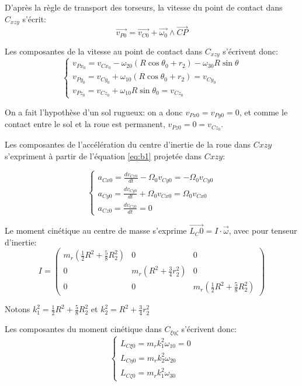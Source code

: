 D'après la règle de transport des torseurs, la vitesse du point de contact dans $C_{xzy}$ s'écrit:
\begin{equation}
    \vec{v_{P0}}=\vec{v_{C0}}+\vec{\omega_0} \wedge \vec{CP}
  \label{eq:b3}
\end{equation}

Les composantes de la vitesse au point de contact dans $C_{xzy}$ s'écrivent donc:
\begin{equation}
  \begin{cases}
    v_{Px_0}=v_{Cx_0}-\omega_{20} (R\cos{\theta_0}+r_2) -\omega_{30} R\sin{\theta} \\
    v_{Py_0}=v_{Cy_0} + \omega_{10} (R\cos{\theta_0}+r_2)= v_{Cy_0}\\
    v_{Pz_0}=v_{Cz_0} + \omega_{10} R\sin{\theta_0} = v_{Cz_0}
  \end{cases}
  \label{eq:b4}
\end{equation}

On a fait l'hypothèse d'un sol rugueux: on a donc $v_{Px0}=v_{Py0}=0$, et comme le contact entre le sol et la roue est permanent, $v_{Pz0}=0=v_{Cz_0}$.


Les composantes de l'accélération du centre d'inertie de la roue dans $C{xzy}$ s'expriment à partir de l'équation \ref{eq:b1} projetée dans $C{xzy}$:

\begin{equation}
  \begin{cases}
    a_{Cx0}=\frac{dv_{Cx0}}{dt}-\Omega_0 v_{Cy0}=-\Omega_0 v_{Cy0} \\
    a_{Cy0}=\frac{dv_{Cy0}}{dt} + \Omega_0 v_{Cx0}=\Omega_0 v_{Cx0}\\
    a_{Cz0}=\frac{dv_{Cz0}}{dt} = 0
  \end{cases}
  \label{eq:b5}
\end{equation}

Le moment cinétique au centre de masse s'exprime $\vec{L_C0}=I \cdot \vec{\omega}$, avec pour tenseur d'inertie:
$$
I=
\begin{pmatrix}
   m_r (\frac{1}{2}R^2+\frac{5}{8}R_2^2) & 0  &  0 \\
  0 &  m_r(R^2+\frac{3}{4}r_2^2) & 0 \\
  0 & 0 & m_r (\frac{1}{2}R^2+\frac{5}{8}R_2^2)
\end{pmatrix}
$$

Notons $k_1^2=\frac{1}{2}R^2+\frac{5}{8}R_2^2$ et $k_2^2=R^2+\frac{3}{4}r_2^2$

Les composantes du moment cinétique dans $C_{\xi \eta \zeta}$ s'écrivent donc:
\begin{equation}
  \begin{cases}
    L_{C\xi 0}=m_r k_1^2 \omega_{10}=0 \\
    L_{C\eta 0}=m_r k_2^2 \omega_{20}\\
    L_{C\zeta 0}=m_r k_1^2 \omega_{30}
  \end{cases}
  \label{eq:b6}
\end{equation}


